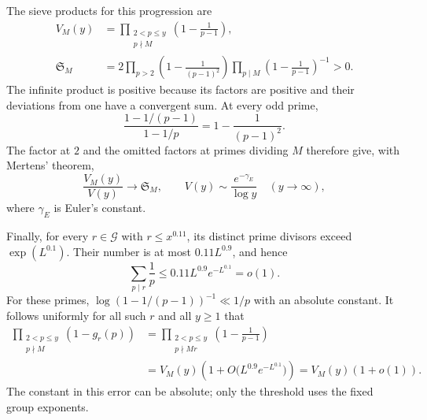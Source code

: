 The sieve products for this progression are
\begin{equation}\label{eq:progression-sieve-products}
 \begin{split}
 V_M(y)&=\prod_{\substack{2<p\le y\\p\nmid M}}
                  \left(1-\frac1{p-1}\right),\\
 \mathfrak S_M&=2\prod_{p>2}\left(1-\frac1{(p-1)^2}\right)
                \prod_{p\mid M}\left(1-\frac1{p-1}\right)^{-1}>0.
 \end{split}
\end{equation}
The infinite product is positive because its factors are positive and
their deviations from one have a convergent sum.  At every odd prime,
\[
 \frac{1-1/(p-1)}{1-1/p}=1-\frac1{(p-1)^2}.
\]
The factor at \(2\) and the omitted factors at primes dividing \(M\)
therefore give, with Mertens' theorem,
\begin{equation}\label{eq:progression-product-asymptotic}
 \frac{V_M(y)}{V(y)}\longrightarrow\mathfrak S_M,
 \qquad V(y)\sim\frac{e^{-\gamma_E}}{\log y}
 \quad(y\to\infty),
\end{equation}
where \(\gamma_E\) is Euler's constant.

Finally, for every \(r\in\mathcal G\) with \(r\le x^{0.11}\), its distinct
prime divisors exceed \(\exp(L^{0.1})\).  Their number is at most
\(0.11L^{0.9}\), and hence
\begin{equation}\label{eq:group-reciprocal-divisors}
 \sum_{p\mid r}\frac1p\le0.11L^{0.9}e^{-L^{0.1}}=o(1).
\end{equation}
For these primes, \(\log(1-1/(p-1))^{-1}\ll1/p\) with an absolute
constant.  It follows uniformly for all such \(r\) and all \(y\ge1\) that
\begin{equation}\label{eq:missing-group-factors}
 \begin{split}
 \prod_{\substack{2<p\le y\\p\nmid M}}(1-g_r(p))
 &=\prod_{\substack{2<p\le y\\p\nmid Mr}}
                \left(1-\frac1{p-1}\right)\\
 &=V_M(y)\left(1+O\bigl(L^{0.9}e^{-L^{0.1}}\bigr)\right)
  =V_M(y)(1+o(1)).
 \end{split}
\end{equation}
The constant in this error can be absolute; only the threshold uses the
fixed group exponents.
